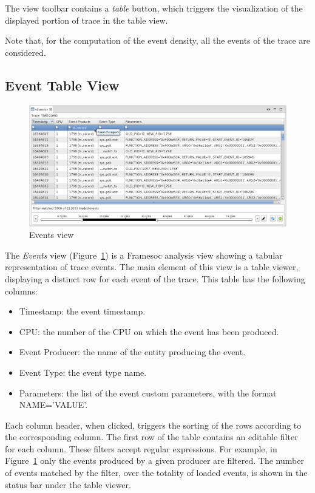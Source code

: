 \documentclass[twoside]{article}
\begin{document}
\begin{sloppypar}
The view toolbar contains a \emph{table} button, which triggers the visualization of the displayed portion of trace in the table view.

Note that, for the computation of the event density, all the events of the trace are considered.

\subsection{Event Table View}
\label{subsec:table}


\begin{figure}[h!]
  \centering
    \includegraphics[width=1.0\textwidth]{images/table_nocategory.png}
  \caption{Events view}
  \label{fig:table_regex}
\end{figure}

The \emph{Events} view (Figure~\ref{fig:table_regex}) is a Framesoc analysis view showing a tabular representation of trace events.
The main element of this view is a table viewer, displaying a distinct row for each event of the trace.
This table has the following columns:
\begin{itemize}
 \item Timestamp: the event timestamp.
 \item CPU: the number of the CPU on which the event has been produced.
 \item Event Producer: the name of the entity producing the event.
 \item Event Type: the event type name.
 \item Parameters: the list of the event custom parameters, with the format NAME='VALUE'.
\end{itemize}
Each column header, when clicked, triggers the sorting of the rows according to the corresponding column. 
The first row of the table contains an editable filter for each column. 
These filters accept regular expressions.
For example, in Figure~\ref{fig:table_regex} only the events produced by a given producer are filtered.
The number of events matched by the filter, over the totality of loaded events, is shown in the status bar under the table viewer.


\end{sloppypar}
\end{document}
